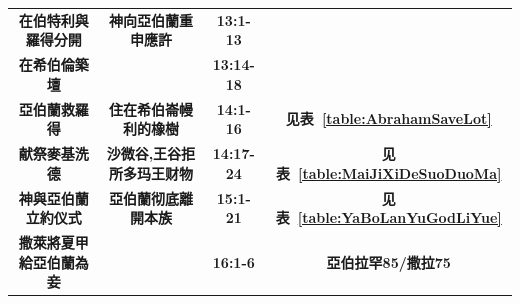 \begin{table}[H]
\begin{threeparttable}
\begin{tabular}{c c c c}
\multicolumn{1}{L{\dimexpr0.25\linewidth-1\tabcolsep\relax}}{\bfseries 在伯特利與羅得分開} 
& \multicolumn{1}{L{\dimexpr0.2\linewidth-1\tabcolsep\relax}}{\bfseries 神向亞伯蘭重申應許} 
& \multicolumn{1}{L{\dimexpr0.1\linewidth-1\tabcolsep\relax}}{\bfseries 13:1-13}
& \multicolumn{1}{L{\dimexpr0.2\linewidth-1\tabcolsep\relax}}{\bfseries }\\

\multicolumn{1}{L{\dimexpr0.25\linewidth-1\tabcolsep\relax}}{\bfseries 在希伯倫築壇}  
& \multicolumn{1}{L{\dimexpr0.2\linewidth-1\tabcolsep\relax}}{\bfseries } 
& \multicolumn{1}{L{\dimexpr0.1\linewidth-1\tabcolsep\relax}}{\bfseries 13:14-18}
& \multicolumn{1}{L{\dimexpr0.2\linewidth-1\tabcolsep\relax}}{\bfseries }\\

\multicolumn{1}{L{\dimexpr0.25\linewidth-1\tabcolsep\relax}}{\bfseries 亞伯蘭救羅得} 
& \multicolumn{1}{L{\dimexpr0.3\linewidth-1\tabcolsep\relax}}{\bfseries 住在希伯崙幔利的橡樹}  
& \multicolumn{1}{L{\dimexpr0.1\linewidth-1\tabcolsep\relax}}{\bfseries 14:1-16}
& \multicolumn{1}{L{\dimexpr0.2\linewidth-1\tabcolsep\relax}}{\bfseries 见表~\ref{table:AbrahamSaveLot}}\\\hline

\multicolumn{1}{L{\dimexpr0.25\linewidth-1\tabcolsep\relax}}{\bfseries 献祭麥基洗德} 
& \multicolumn{1}{L{\dimexpr0.3\linewidth-1\tabcolsep\relax}}{\bfseries 沙微谷,王谷拒所多玛王财物}  
& \multicolumn{1}{L{\dimexpr0.1\linewidth-1\tabcolsep\relax}}{\bfseries 14:17-24}
& \multicolumn{1}{L{\dimexpr0.2\linewidth-1\tabcolsep\relax}}{\bfseries 见表~\ref{table:MaiJiXiDeSuoDuoMa} }\\

\multicolumn{1}{L{\dimexpr0.25\linewidth-1\tabcolsep\relax}}{\bfseries 神與亞伯蘭立約仪式} 
& \multicolumn{1}{L{\dimexpr0.2\linewidth-1\tabcolsep\relax}}{\bfseries 亞伯蘭彻底離開本族}  
& \multicolumn{1}{L{\dimexpr0.1\linewidth-1\tabcolsep\relax}}{\bfseries 15:1-21}
& \multicolumn{1}{L{\dimexpr0.2\linewidth-1\tabcolsep\relax}}{\bfseries 见表~\ref{table:YaBoLanYuGodLiYue}}\\

\multicolumn{1}{L{\dimexpr0.265\linewidth-1\tabcolsep\relax}}{\bfseries 撒萊將夏甲給亞伯蘭為妾}  
& \multicolumn{1}{L{\dimexpr0.2\linewidth-1\tabcolsep\relax}}{\bfseries } 
& \multicolumn{1}{L{\dimexpr0.1\linewidth-1\tabcolsep\relax}}{\bfseries 16:1-6}
& \multicolumn{1}{L{\dimexpr0.2\linewidth-1\tabcolsep\relax}}{\bfseries 亞伯拉罕85/撒拉75}\\


\end{tabular}
\end{threeparttable}
\end{table}
